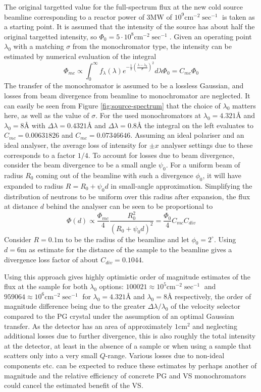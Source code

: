 \documentclass{article}
\begin{document}
The original targetted value for the full-spectrum flux at the new cold source beamline corresponding to a reactor power of $3\unit{\mega\watt}$ of $10^9 \unit{\centi\meter^{-2}\sec^{-1}}$ \cite{OYSTER2008} is taken as a starting point. It is assumed that the intensity of the source has about half the original targetted intensity, so $\Phi_0 = 5\cdot 10^8\unit{\centi\meter^{-2}\sec^{-1}}$. Given an operating point $\lambda_0$ with a matching $\sigma$ from the monochromator type, the intensity can be estimated by numerical evaluation of the integral
$$\Phi_{mc} \propto \int_0^\infty f_\lambda(\lambda)e^{-\frac{1}{2}\left(\frac{\lambda - \lambda_0}{\sigma}\right)^2}d\lambda \Phi_0= C_{mc}\Phi_0$$
The transfer of the monochromator is assumed to be a lossless Gaussian, and losses from beam divergence from beamline to monochromator are neglected.  It can easily be seen from Figure \ref{fig:source-spectrum} that the choice of $\lambda_0$ matters here, as well as the value of $\sigma$. For the used monochromators at $\lambda_0 = 4.321$Å and $\lambda_0 = 8$Å with $\Delta\lambda = 0.4321$Å and $\Delta\lambda = 0.8$Å the integral on the left evaluates to $C_{mc} = 0.00631826$ and $C_{mc} = 0.07346646$. Assuming an ideal polariser and an ideal analyser, the average loss of intensity for $\pm x$ analyser settings due to these corresponds to a factor $1/4$. To account for losses due to beam divergence, consider the beam divergence to be a small angle $\psi_0$. 
For a uniform beam of radius $R_0$ coming out of the beamline with such a divergence $\phi_0$, it will have expanded to radius $R = R_0 + \psi_0 d$ in small-angle approximation. Simplifying the distribution of neutrons to be uniform over this radius after expansion, the flux at distance $d$ behind the analyser can be seen to be proportional to
$$\Phi(d) \propto \frac{\Phi_{mc}}{4}\frac{R_0^2}{(R_0 + \psi_0 d)^2} = \frac{\Phi_0}{4}C_{mc}C_{div}$$
Consider $R = 0.1 \unit{\meter}$ to be the radius of the beamline and let $\phi_0 = 2^\circ$. Using $d = 6 \unit{\meter}$ as estimate for the distance of the sample to the beamline gives a divergence loss factor of about $C_{div} = 0.1044$.

Using this approach gives highly optimistic order of magnitude estimates of the flux at the sample for both $\lambda_0$ options: $100021 \approx 10^5 \unit{\centi\meter^{-2}\sec^{-1}}$ and $959064 \approx 10^6 \unit{\centi\meter^{-2}\sec^{-1}}$ for $\lambda_0 = 4.321$Å and $\lambda_0 = 8$Å respectively, the order of magnitude difference being due to the greater $\Delta\lambda/\lambda_0$ of the velocity selector compared to the PG crystal under the assumption of an optimal Gaussian transfer. As the detector has an area of approximately $1 \unit{\centi\meter^2}$ and neglecting additional losses due to further divergence, this is also roughly the total intensity at the detector, at least in the absence of a sample or when using a sample that scatters only into a very small $Q$-range. Various losses due to non-ideal components etc. can be expected to reduce these estimates by perhaps another of magnitude and the relative efficiency of concrete PG and VS monochromators could cancel the estimated benefit of the VS.
\end{document}
